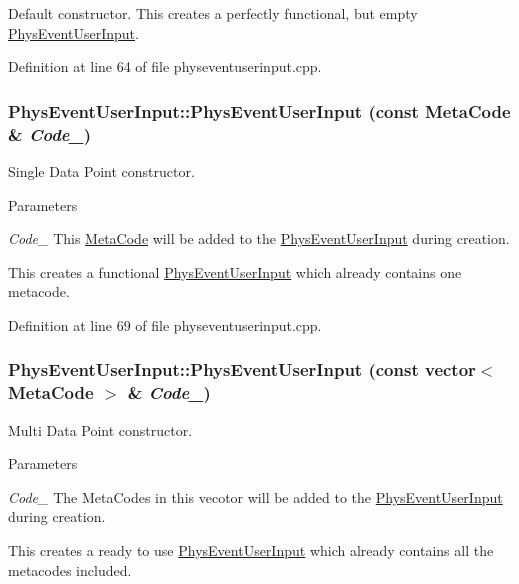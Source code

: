Default constructor. This creates a perfectly functional, but empty \hyperlink{classPhysEventUserInput}{PhysEventUserInput}. 

Definition at line 64 of file physeventuserinput.cpp.\hypertarget{classPhysEventUserInput_ae13b1b02bfa3ef64dc4205478a68810f}{
\subsubsection[{PhysEventUserInput}]{\setlength{\rightskip}{0pt plus 5cm}PhysEventUserInput::PhysEventUserInput (const {\bf MetaCode} \& {\em Code\_\-})}}
\label{dc/d0e/classPhysEventUserInput_ae13b1b02bfa3ef64dc4205478a68810f}


Single Data Point constructor. 
\begin{DoxyParams}{Parameters}
\item[{\em Code\_\-}]This \hyperlink{classMetaCode}{MetaCode} will be added to the \hyperlink{classPhysEventUserInput}{PhysEventUserInput} during creation.\end{DoxyParams}
This creates a functional \hyperlink{classPhysEventUserInput}{PhysEventUserInput} which already contains one metacode. 

Definition at line 69 of file physeventuserinput.cpp.\hypertarget{classPhysEventUserInput_a8b1c0e36d39075dffa4f88d10f2376d9}{
\subsubsection[{PhysEventUserInput}]{\setlength{\rightskip}{0pt plus 5cm}PhysEventUserInput::PhysEventUserInput (const vector$<$ {\bf MetaCode} $>$ \& {\em Code\_\-})}}
\label{dc/d0e/classPhysEventUserInput_a8b1c0e36d39075dffa4f88d10f2376d9}


Multi Data Point constructor. 
\begin{DoxyParams}{Parameters}
\item[{\em Code\_\-}]The MetaCodes in this vecotor will be added to the \hyperlink{classPhysEventUserInput}{PhysEventUserInput} during creation.\end{DoxyParams}
This creates a ready to use \hyperlink{classPhysEventUserInput}{PhysEventUserInput} which already contains all the metacodes included. 

